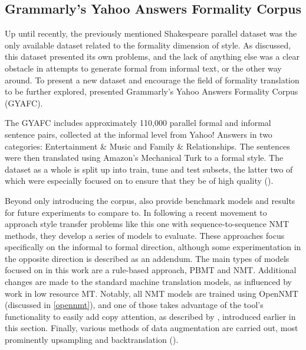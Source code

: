 \subsection{Grammarly's Yahoo Answers Formality Corpus} \label{gyafc}

Up until recently, the previously mentioned Shakespeare parallel dataset was the only available dataset related to the formality dimension of style. As discussed, this dataset presented its own problems, and the lack of anything else was a clear obstacle in attempts to generate formal from informal text, or the other way around. To present a new dataset and encourage the field of formality translation to be further explored, \cite{rao2018gyafc} presented Grammarly's Yahoo Answers Formality Corpus (GYAFC).

The GYAFC includes approximately 110,000 parallel formal and informal sentence pairs, collected at the informal level from Yahoo! Answers in two categories: Entertainment \& Music and Family \& Relationships. The sentences were then translated using Amazon's Mechanical Turk to a formal style. The dataset as a whole is split up into train, tune and test subsets, the latter two of which were especially focused on to ensure that they be of high quality (\cite{rao2018gyafc}).

Beyond only introducing the corpus, \cite{rao2018gyafc} also provide benchmark models and results for future experiments to compare to. In following a recent movement to approach style transfer problems like this one with sequence-to-sequence NMT methods, they develop a series of models to evaluate. These approaches focus specifically on the informal to formal direction, although some experimentation in the opposite direction is described as an addendum. The main types of models focused on in this work are a rule-based approach, PBMT and NMT. Additional changes are made to the standard machine translation models, as influenced by work in low resource MT. Notably, all NMT models are trained using OpenNMT (discussed in \ref{opennmt}), and one of those takes advantage of the tool's functionality to easily add copy attention, as described by \cite{jhamtani2017copy}, introduced earlier in this section. Finally, various methods of data augmentation are carried out, most prominently upsampling and backtranslation (\cite{rao2018gyafc}).

